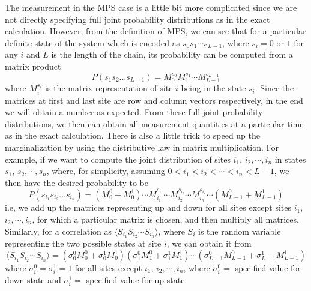 The measurement in the MPS case is a little bit more complicated since we are not directly specifying full joint probability distributions as in the exact calculation. However, from the definition of MPS, we can see that for a particular definite state of the system which is encoded as $s_0s_1\cdots s_{L-1}$, where $s_i=0$ or $1$ for any $i$ and $L$ is the length of the chain, its probability can be computed from a matrix product 
\begin{displaymath}
P(s_1s_2\dots s_{L-1}) = M_0^{s_0}M_1^{s_1}\cdots M_{L-1}^{s_{L-1}}
\end{displaymath} 
where $M_i^{s_i}$ is the matrix representation of site $i$ being in the state $s_i$. Since the matrices at first and last site are row and column vectors respectively, in the end we will obtain a number as expected. From these full joint probability distributions, we then can obtain all measurement quantities at a particular time as in the exact calculation. There is also a little trick to speed up the marginalization by using the distributive law in matrix multiplication. For example, if we want to compute the joint distribution of sites $i_1$, $i_2,\cdots,i_n$ in states $s_1$, $s_2,\cdots,s_n$, where, for simplicity, assuming $0<i_1<i_2<\cdots<i_n<L-1$, we then have the desired probability to be
\begin{displaymath}
P(s_{i_1}s_{i_2}\dots s_{i_n}) = (M_0^{0} + M_0^{1})\cdots M_{i_1}^{s_{i_1}}\cdots M_{i_2}^{s_{i_2}} \cdots M_{i_n}^{s_{i_n}} \cdots (M_{L-1}^{0} + M_{L-1}^{1})
\end{displaymath}
i.e, we add up the matrices representing up and down for all sites except sites $i_1$, $i_2,\cdots,i_n$, for which a particular matrix is chosen, and then multiply all matrices. Similarly, for a correlation as $\langle S_{i_1} S_{i_2} \cdots S_{i_n} \rangle$, where $S_i$ is the random variable representing the two possible states at site $i$, we can obtain it from
\begin{displaymath}
\langle S_{i_1} S_{i_2} \cdots S_{i_n} \rangle = (\sigma_0^0 M_0^0 + \sigma_0^1M_0^1)(\sigma_1^0M_1^0 + \sigma_1^1M_1^1)\cdots (\sigma_{L-1}^0M_{L-1}^0 + \sigma_{L-1}^1M^1_{L-1})
\end{displaymath}
where $\sigma_i^0=\sigma_i^1=1$ for all sites except $i_1$, $i_2,\cdots,i_n$, where $\sigma_i^0=$ specified value for down state and $\sigma_i^1=$ specified value for up state. 
